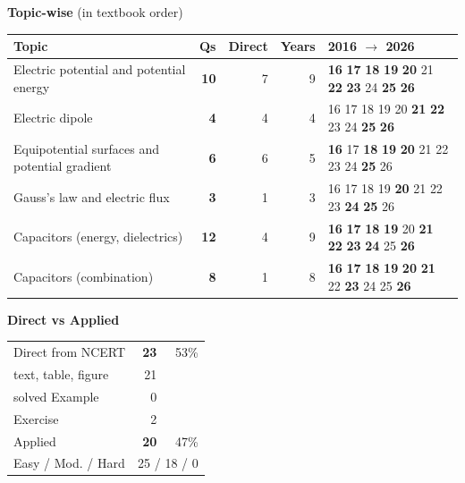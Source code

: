{\small\textbf{\color{crimson}Topic-wise} (in textbook order)\par\smallskip
\begin{tabularx}{\linewidth}{@{}>{\raggedright\arraybackslash}Xrrrl@{}}\toprule
Topic & Qs & Direct & Years & 2016 $\rightarrow$ 2026\\\midrule
Electric potential and potential energy & \textbf{10} & 7 & 9 & {\scriptsize \textbf{16} \textbf{17} \textbf{18} \textbf{19} \textbf{20} {\color{gray!45}21} \textbf{22} \textbf{23} {\color{gray!45}24} \textbf{25} \textbf{26}}\\
Electric dipole & \textbf{4} & 4 & 4 & {\scriptsize {\color{gray!45}16} {\color{gray!45}17} {\color{gray!45}18} {\color{gray!45}19} {\color{gray!45}20} \textbf{21} \textbf{22} {\color{gray!45}23} {\color{gray!45}24} \textbf{25} \textbf{26}}\\
Equipotential surfaces and potential gradient & \textbf{6} & 6 & 5 & {\scriptsize \textbf{16} {\color{gray!45}17} \textbf{18} \textbf{19} \textbf{20} {\color{gray!45}21} {\color{gray!45}22} {\color{gray!45}23} {\color{gray!45}24} \textbf{25} {\color{gray!45}26}}\\
Gauss's law and electric flux & \textbf{3} & 1 & 3 & {\scriptsize {\color{gray!45}16} {\color{gray!45}17} {\color{gray!45}18} {\color{gray!45}19} \textbf{20} {\color{gray!45}21} {\color{gray!45}22} {\color{gray!45}23} \textbf{24} \textbf{25} {\color{gray!45}26}}\\
Capacitors (energy, dielectrics) & \textbf{12} & 4 & 9 & {\scriptsize \textbf{16} \textbf{17} \textbf{18} \textbf{19} {\color{gray!45}20} \textbf{21} \textbf{22} \textbf{23} \textbf{24} {\color{gray!45}25} \textbf{26}}\\
Capacitors (combination) & \textbf{8} & 1 & 8 & {\scriptsize \textbf{16} \textbf{17} \textbf{18} \textbf{19} \textbf{20} \textbf{21} {\color{gray!45}22} \textbf{23} {\color{gray!45}24} {\color{gray!45}25} \textbf{26}}\\
\bottomrule\end{tabularx}}\par\medskip
\begin{minipage}[t]{0.34\linewidth}{\small\textbf{\color{crimson}Direct vs Applied}\par\smallskip
\begin{tabular}{@{}lrr@{}}\toprule
Direct from NCERT & \textbf{23} & 53\%\\
\quad text, table, figure & 21 &\\
\quad solved Example & 0 &\\
\quad Exercise & 2 &\\
Applied & \textbf{20} & 47\%\\\midrule
Easy / Mod. / Hard & \multicolumn{2}{r}{25 / 18 / 0}\\\bottomrule
\end{tabular}}\end{minipage}\hfill
